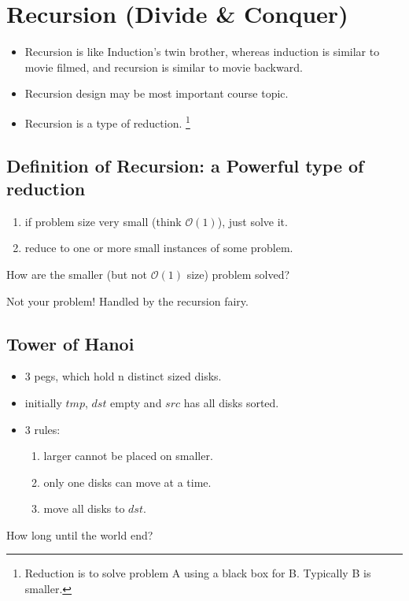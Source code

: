 \section{Recursion (Divide \& Conquer)}
\begin{itemize}
\item Recursion is like Induction's twin brother, whereas induction is similar to movie filmed, and recursion is similar to movie backward.
\item Recursion design may be most important course topic.
\item Recursion is a type of reduction. \footnote{Reduction is to solve problem A using a black box for B. Typically B is smaller.}
\end{itemize}

\subsection{Definition of Recursion: a Powerful type of reduction}
\begin{enumerate}
\item if problem size very small (think $\mathcal{O}(1)$), just solve it.
\item reduce to one or more small instances of some problem.
\end{enumerate}

\question How are the smaller (but not $\mathcal{O}(1)$ size) problem solved?

Not your problem! Handled by the recursion fairy.

\subsection{Tower of Hanoi}
\begin{itemize}
    \item 3 pegs, which hold n distinct sized disks.
    \item initially $tmp$, $dst$ empty and $src$ has all disks sorted.
    \item 3 rules:
    \begin{enumerate}
        \item larger cannot be placed on smaller.
        \item only one disks can move at a time.
        \item move all disks to $dst$.
    \end{enumerate}
\end{itemize}

\question How long until the world end?

\solution


